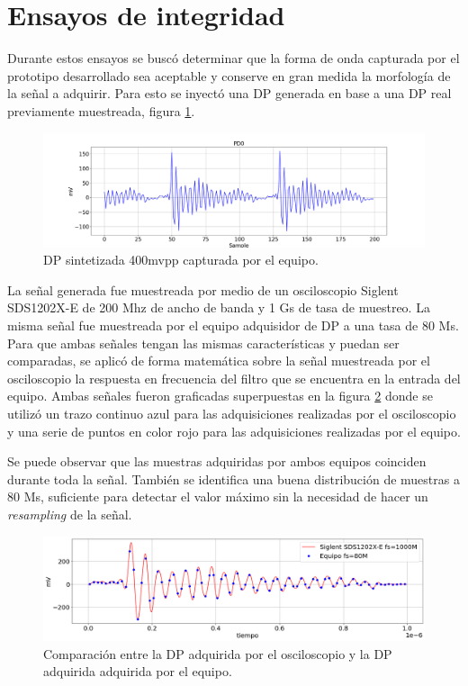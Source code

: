 \vspace{10mm}

\section{Ensayos de integridad}


Durante estos ensayos se buscó determinar que la forma de onda capturada por el prototipo desarrollado sea aceptable y conserve en gran medida la morfología de la señal a adquirir. Para esto se inyectó una DP generada en base a una DP real previamente muestreada, figura \ref{fig:dpSint}.

\begin{figure}[htpb]
	\hspace{-1.2cm}
	\includegraphics[width=165mm]{./Figures/dpSint.png}
	\caption{DP sintetizada 400mvpp capturada por el equipo.}
	\label{fig:dpSint}
\end{figure}

La señal generada fue muestreada por medio de un osciloscopio Siglent SDS1202X-E de 200 Mhz de ancho de banda y 1 Gs de tasa de muestreo. La misma señal fue muestreada por el equipo adquisidor de DP a una tasa de 80 Ms. Para que ambas señales tengan las mismas características y puedan ser comparadas, se aplicó de forma matemática sobre la señal muestreada por el osciloscopio la respuesta en frecuencia del filtro que se encuentra en la entrada del equipo. Ambas señales fueron graficadas superpuestas en la figura \ref{fig:compPulsos} donde se utilizó un trazo continuo azul para las adquisiciones realizadas por el osciloscopio y una serie de puntos en color rojo para las adquisiciones realizadas por el equipo.

Se puede observar que las muestras adquiridas por ambos equipos coinciden durante toda la señal. También se identifica una buena distribución de muestras a 80 Ms, suficiente para detectar el valor máximo sin la necesidad de hacer un \textit{resampling} de la señal.


\begin{figure}[ht]
	\centering
	\includegraphics[width=135mm]{./Figures/compPulsos.png}
	\caption{Comparación entre la DP adquirida por el osciloscopio y la DP adquirida adquirida por el equipo.}
	\label{fig:compPulsos}
\end{figure}


